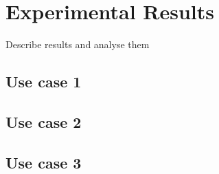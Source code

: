 
\chapter{Experimental Results}
Describe results and analyse them

\section{Use case 1}


\section{Use case 2}


\section{Use case 3}
